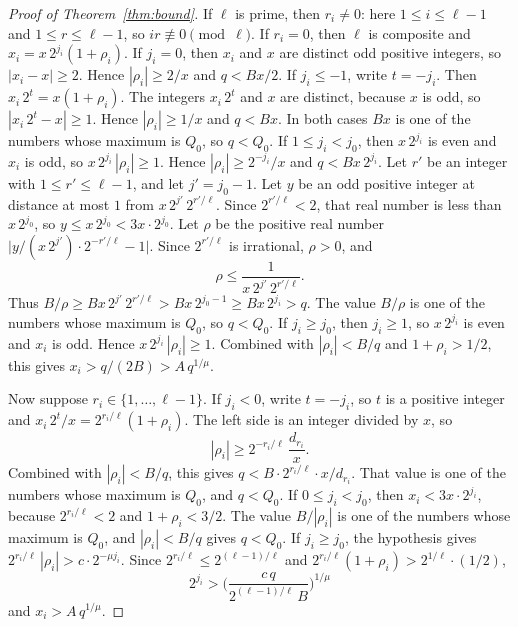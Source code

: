 \documentclass[11pt]{article}
\begin{document}
\begin{proof}[Proof of Theorem~\ref{thm:bound}]
If $\ell$ is prime, then $r_i \ne 0$: here $1 \le i \le \ell-1$ and $1 \le r \le \ell-1$, so $ir \not\equiv 0 \pmod{\ell}$.
If $r_i = 0$, then $\ell$ is composite and $x_i = x\, 2^{j_i}(1+\rho_i)$.
If $j_i = 0$, then $x_i$ and $x$ are distinct odd positive integers, so $|x_i - x| \ge 2$.
Hence $|\rho_i| \ge 2/x$ and $q < Bx/2$.
If $j_i \le -1$, write $t = -j_i$.
Then $x_i\, 2^{t} = x(1+\rho_i)$.
The integers $x_i\, 2^{t}$ and $x$ are distinct, because $x$ is odd, so $|x_i\, 2^{t} - x| \ge 1$.
Hence $|\rho_i| \ge 1/x$ and $q < Bx$.
In both cases $Bx$ is one of the numbers whose maximum is $Q_0$, so $q < Q_0$.
If $1 \le j_i < j_0$, then $x\, 2^{j_i}$ is even and $x_i$ is odd, so $x\, 2^{j_i}\, |\rho_i| \ge 1$.
Hence $|\rho_i| \ge 2^{-j_i}/x$ and $q < Bx\, 2^{j_i}$.
Let $r'$ be an integer with $1 \le r' \le \ell - 1$, and let $j' = j_0 - 1$.
Let $y$ be an odd positive integer at distance at most $1$ from $x\, 2^{j'}\, 2^{r'/\ell}$.
Since $2^{r'/\ell} < 2$, that real number is less than $x\, 2^{j_0}$, so $y \le x\, 2^{j_0} < 3x \cdot 2^{j_0}$.
Let $\rho$ be the positive real number $\bigl| y/(x\, 2^{j'}) \cdot 2^{-r'/\ell} - 1 \bigr|$.
Since $2^{r'/\ell}$ is irrational, $\rho > 0$, and
\[
\rho \le \frac{1}{x\, 2^{j'}\, 2^{r'/\ell}}.
\]
Thus $B/\rho \ge Bx\, 2^{j'}\, 2^{r'/\ell} > Bx\, 2^{j_0 - 1} \ge Bx\, 2^{j_i} > q$.
The value $B/\rho$ is one of the numbers whose maximum is $Q_0$, so $q < Q_0$.
If $j_i \ge j_0$, then $j_i \ge 1$, so $x\, 2^{j_i}$ is even and $x_i$ is odd.
Hence $x\, 2^{j_i}\, |\rho_i| \ge 1$.
Combined with $|\rho_i| < B/q$ and $1+\rho_i > 1/2$, this gives $x_i > q/(2B) > A\, q^{1/\mu}$.

Now suppose $r_i \in \{1, \ldots, \ell-1\}$.
If $j_i < 0$, write $t = -j_i$, so $t$ is a positive integer and $x_i\, 2^{t}/x = 2^{r_i/\ell}(1+\rho_i)$.
The left side is an integer divided by $x$, so
\[
|\rho_i| \ge 2^{-r_i/\ell}\, \frac{d_{r_i}}{x}.
\]
Combined with $|\rho_i| < B/q$, this gives $q < B \cdot 2^{r_i/\ell} \cdot x / d_{r_i}$.
That value is one of the numbers whose maximum is $Q_0$, and $q < Q_0$.
If $0 \le j_i < j_0$, then $x_i < 3x \cdot 2^{j_i}$, because $2^{r_i/\ell} < 2$ and $1+\rho_i < 3/2$.
The value $B/|\rho_i|$ is one of the numbers whose maximum is $Q_0$, and $|\rho_i| < B/q$ gives $q < Q_0$.
If $j_i \ge j_0$, the hypothesis gives $2^{r_i/\ell}\, |\rho_i| > c \cdot 2^{-\mu j_i}$.
Since $2^{r_i/\ell} \le 2^{(\ell-1)/\ell}$ and $2^{r_i/\ell}(1+\rho_i) > 2^{1/\ell}\cdot(1/2)$,
\[
2^{j_i} > \Biggl( \frac{c\, q}{2^{(\ell-1)/\ell}\, B} \Biggr)^{1/\mu}
\]
and $x_i > A\, q^{1/\mu}$.


\end{proof}
\end{document}
